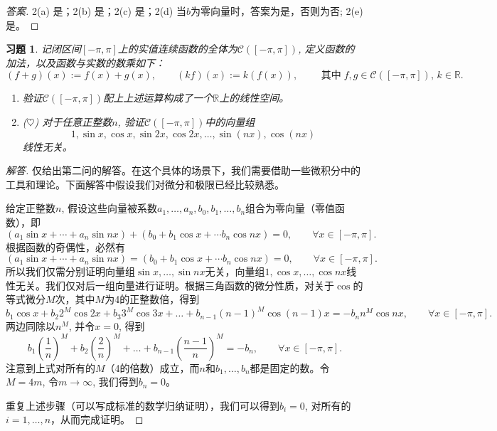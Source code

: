 \documentclass[UTF8]{ctexart}
\newtheorem{ex}[thm]{习题}
\begin{document}
\begin{proof}[答案] 2(a) 是；2(b) 是；2(c) 是；2(d) 当$b$为零向量时，答案为是，否则为否; 2(e) 是。
\end{proof}


\begin{ex}
记闭区间$[-\pi,\pi]$上的实值连续函数的全体为$\mathcal{C}([-\pi,\pi])$, 定义函数的加法，以及函数与实数的数乘如下：
\begin{equation*}
(f+g)(x) := f(x) + g(x), \qquad (kf)(x) := k(f(x)), \qquad \text{ 其中}\; f,g \in \mathcal{C}([-\pi,\pi]), \, k \in \mathbb{R}.
\end{equation*}
\begin{enumerate}
\item 验证$\mathcal{C}([-\pi,\pi])$配上上述运算构成了一个$\mathbb{R}$上的线性空间。
\item {($\heartsuit  $)} 对于任意正整数$n$, 验证$\mathcal{C}([-\pi,\pi])$中的向量组
\begin{equation*}
1, \sin x, \cos x, \sin 2x, \cos 2x, \dots, \sin (nx), \cos (nx)
\end{equation*}
线性无关。
\end{enumerate}
\end{ex}

\begin{proof}[解答] 仅给出第二问的解答。在这个具体的场景下，我们需要借助一些微积分中的工具和理论。下面解答中假设我们对微分和极限已经比较熟悉。

给定正整数$n$, 假设这些向量被系数$a_1,\dots,a_n,b_0,b_1,\dots,b_n$组合为零向量（零值函数），即
\begin{equation*}
(a_1 \sin x + \cdots + a_n \sin nx) + (b_0 + b_1\cos x + \cdots b_n\cos nx) = 0, \qquad \forall x \in [-\pi,\pi].
\end{equation*}
根据函数的奇偶性，必然有
\begin{equation*}
(a_1 \sin x + \cdots + a_n \sin nx) = (b_0 + b_1\cos x + \cdots b_n\cos nx) = 0, \qquad \forall x \in [-\pi,\pi].
\end{equation*}
所以我们仅需分别证明向量组$\sin x,\dots,\sin nx$无关，向量组$1,\cos x, \dots, \cos nx$线性无关。我们仅对后一组向量进行证明。根据三角函数的微分性质，对关于$\cos$的等式微分$M$次，其中$M$为4的正整数倍，得到
\begin{equation*}
b_1 \cos x + b_2 2^{M} \cos 2x + b_3 3^M  \cos 3x + \dots + b_{n-1} (n-1)^{M} \cos (n-1)x = - b_n n^M \cos nx, \qquad \forall x\in [-\pi,\pi].
\end{equation*}
两边同除以$n^M$, 并令$x=0$, 得到
\begin{equation*}
b_1 (\frac{1}{n})^M  + b_2 (\frac{2}{n})^M  +  \dots + b_{n-1} (\frac{n-1}{n})^{M}  = - b_n, \qquad \forall x\in [-\pi,\pi].
\end{equation*}
注意到上式对所有的$M$（4的倍数）成立，而$n$和$b_1,\dots,b_n$都是固定的数。令$M=4m$, 令$m\to \infty$, 我们得到$b_n = 0$。

重复上述步骤（可以写成标准的数学归纳证明），我们可以得到$b_i =0$, 对所有的$i=1,\dots,n$，从而完成证明。
\end{proof}
\end{document}
